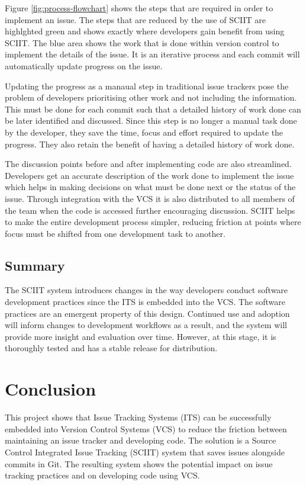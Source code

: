 \documentclass{mproj}
\begin{document}
Figure \ref{fig:process-flowchart} shows the steps that are required in order to implement an issue. The steps that are reduced by the use of SCIIT are highlghted green and shows exactly where developers gain benefit from using SCIIT. The blue area shows the work that is done within version control to implement the details of the issue. It is an iterative process and each commit will automatically update progress on the issue.

Updating the progress as a manaual step in traditional issue trackers pose the problem of developers prioritising other work and not including the information. This must be done for each commit such that a detailed history of work done can be later identified and discussed. Since this step is no longer a manual task done by the developer, they save the time, focus and effort required to update the progress. They also retain the benefit of having a detailed history of work done.

The discussion points before and after implementing code are also streamlined. Developers get an accurate description of the work done to implement the issue which helps in making decisions on what must be done next or the status of the issue. Through integration with the VCS it is also distributed to all members of the team when the code is accessed further encouraging discussion. SCIIT helps to make the entire development process simpler, reducing friction at points where focus must be shifted from one development task to another.

\section{Summary}

The SCIIT system introduces changes in the way developers conduct software development practices since the ITS is embedded into the VCS. The software practices are an emergent property of this design. Continued use and adoption will inform changes to development workflows as a result, and the system will provide more insight and evaluation over time. However, at this stage, it is thoroughly tested and has a stable release for distribution.


\chapter{Conclusion}\label{conclusion}

This project shows that Issue Tracking Systems (ITS) can be successfully embedded into Version Control Systems (VCS) to reduce the friction between maintaining an issue tracker and developing code. The solution is a Source Control Integrated Issue Tracking (SCIIT) system that saves issues alongside commits in Git. The resulting system shows the potential impact on issue tracking practices and on developing code using VCS.
\end{document}
